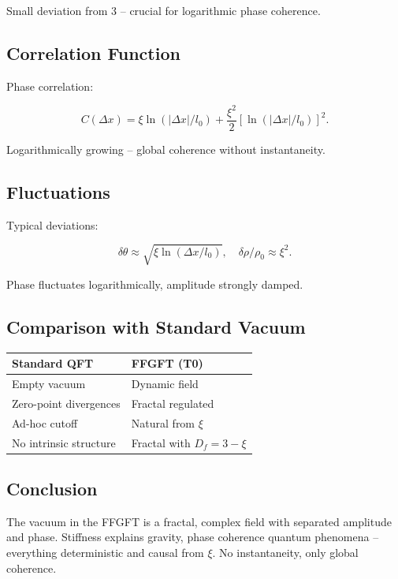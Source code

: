 	Small deviation from 3 – crucial for logarithmic phase coherence.
	
	\subsection*{Correlation Function}
	
	Phase correlation:
	
	\begin{equation}
		C(\Delta x) = \xi \ln(|\Delta x|/l_0) + \frac{\xi^2}{2} [\ln(|\Delta x|/l_0)]^2.
	\end{equation}
	
	Logarithmically growing – global coherence without instantaneity.
	
	\subsection*{Fluctuations}
	
	Typical deviations:
	
	\begin{equation}
		\delta \theta \approx \sqrt{\xi \ln(\Delta x / l_0)}, \quad \delta \rho / \rho_0 \approx \xi^2.
	\end{equation}
	
	Phase fluctuates logarithmically, amplitude strongly damped.
	
	\subsection*{Comparison with Standard Vacuum}
	
	\begin{center}
		\begin{tabular}{p{}p{}}
			\textbf{Standard QFT} & \textbf{FFGFT (T0)} \\
			\hline
			Empty vacuum & Dynamic field \\
			Zero-point divergences & Fractal regulated \\
			Ad-hoc cutoff & Natural from \(\xi\) \\
			No intrinsic structure & Fractal with \(D_f = 3 - \xi\) \\
		\end{tabular}
	\end{center}
	
	\subsection*{Conclusion}
	
	The vacuum in the FFGFT is a fractal, complex field with separated amplitude and phase. Stiffness explains gravity, phase coherence quantum phenomena – everything deterministic and causal from \(\xi\). No instantaneity, only global coherence.



